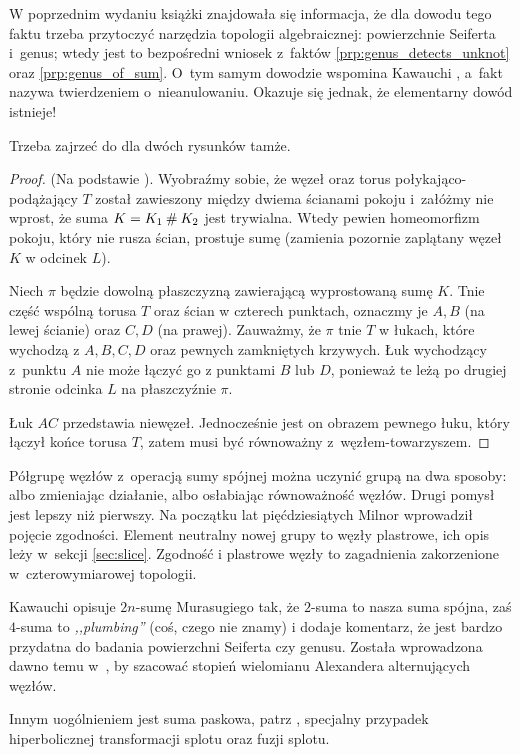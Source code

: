 W poprzednim wydaniu książki znajdowała się informacja, że dla dowodu tego faktu trzeba przytoczyć narzędzia topologii algebraicznej: powierzchnie Seiferta i~genus; wtedy jest to bezpośredni wniosek z~faktów \ref{prp:genus_detects_unknot} oraz \ref{prp:genus_of_sum}.
O~tym samym dowodzie wspomina Kawauchi \cite[s. 33]{kawauchi96}, a~fakt nazywa twierdzeniem o~nieanulowaniu.
Okazuje się jednak, że elementarny dowód istnieje!

Trzeba zajrzeć do \cite[s. 18-20]{kauffman95} dla dwóch rysunków tamże.

\begin{proof}
    (Na podstawie \cite[s. 18-20]{kauffman95}).
    Wyobraźmy sobie, że węzeł oraz torus połykająco-podążający $T$ został zawieszony między dwiema ścianami pokoju i~załóżmy nie wprost, że suma $K = K_1 \mathbin{\#} K_2$ jest trywialna.
    Wtedy pewien homeomorfizm pokoju, który nie rusza ścian, prostuje sumę (zamienia pozornie zaplątany węzeł $K$ w odcinek $L$). 

    Niech $\pi$ będzie dowolną płaszczyzną zawierającą wyprostowaną sumę $K$.
    Tnie część wspólną torusa $T$ oraz ścian w czterech punktach, oznaczmy je $A, B$ (na lewej ścianie) oraz $C, D$ (na prawej).
    Zauważmy, że $\pi$ tnie $T$ w łukach, które wychodzą z $A, B, C, D$ oraz pewnych zamkniętych krzywych.
    Łuk wychodzący z~punktu $A$ nie może łączyć go z punktami $B$ lub $D$, ponieważ te leżą po drugiej stronie odcinka $L$ na płaszczyźnie $\pi$.
    
    Łuk $AC$ przedstawia niewęzeł.
    Jednocześnie jest on obrazem pewnego łuku, który łączył końce torusa $T$, zatem musi być równoważny z~węzłem-towarzyszem.
\end{proof}

Półgrupę węzłów z~operacją sumy spójnej można uczynić grupą na dwa sposoby: albo zmieniając działanie, albo osłabiając równoważność węzłów.
Drugi pomysł jest lepszy niż pierwszy.
Na początku lat pięćdziesiątych Milnor wprowadził pojęcie zgodności.
%
%
Element neutralny nowej grupy to węzły plastrowe, ich opis leży w~sekcji \ref{sec:slice}.
Zgodność i plastrowe węzły to zagadnienia zakorzenione w~czterowymiarowej topologii.

Kawauchi \cite[s. 50-53]{kawauchi96} opisuje $2n$-sumę Murasugiego tak, że $2$-suma to nasza suma spójna, zaś $4$-suma to \emph{,,plumbing''} (coś, czego nie znamy) i dodaje komentarz, że jest bardzo przydatna do badania powierzchni Seiferta czy genusu.
%
%
Została wprowadzona dawno temu w~\cite{murasugi58}, by szacować stopień wielomianu Alexandera alternujących węzłów.
%
%
%

Innym uogólnieniem jest suma paskowa, patrz \cite[s. 31-32, 43]{kawauchi96}, specjalny przypadek hiperbolicznej transformacji splotu oraz fuzji splotu.
%


